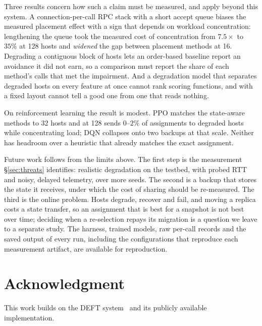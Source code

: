 \documentclass[journal]{IEEEtran}
\begin{document}
Three results concern how such a claim must be measured, and apply beyond this
system. A connection-per-call RPC stack with a short accept queue biases the
measured placement effect with a sign that depends on workload concentration:
lengthening the queue took the measured cost of concentration from $7.5\times$
to $35\%$ at 128 hosts and \emph{widened} the gap between placement methods at
16. Degrading a contiguous block of hosts lets an order-based baseline report
an avoidance it did not earn, so a comparison must report the share of each
method's calls that met the impairment. And a degradation model that separates
degraded hosts on every feature at once cannot rank scoring functions, and
with a fixed layout cannot tell a good one from one that reads nothing.

On reinforcement learning the result is modest. PPO matches the state-aware
methods to 32 hosts and at 128 sends $0$--$2\%$ of assignments to degraded
hosts while concentrating load;
DQN collapses onto two backups at that scale. Neither has headroom over a
heuristic that already matches the exact assignment.

Future work follows from the limits above. The first step is the measurement
\S\ref{sec:threats} identifies: realistic degradation on the testbed, with
probed RTT and noisy, delayed telemetry, over more seeds. The second is a
backup that stores the state it receives, under which the cost of sharing
should be re-measured. The third is the online problem. Hosts degrade, recover
and fail, and moving a replica costs a state transfer, so an assignment that is
best for a snapshot is not best over time; deciding when a re-selection repays
its migration is a question we leave to a separate study. The harness, trained
models, raw per-call records and the saved output of every run, including the
configurations that reproduce each measurement artifact, are available for
reproduction.

\section*{Acknowledgment}
This work builds on the DEFT system~\cite{shahriyar2023deft} and its publicly
available implementation.



\end{document}
